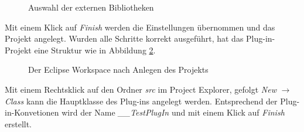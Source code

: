 \begin{figure}[H]
  \vspace{0.5cm}
  \centering
  \caption{Auswahl der externen Bibliotheken}
  \label{libs}
  \vspace{0.5cm}
\end{figure}

Mit einem Klick auf \textit{Finish} werden die Einstellungen übernommen und das Projekt angelegt. Wurden alle Schritte korrekt ausgeführt, hat das Plug-in-Projekt eine Struktur wie in Abbildung \ref{workspace}.

\begin{figure}[H]
  \vspace{0.5cm}
  \centering
  \caption{Der Eclipse Workspace nach Anlegen des Projekts}
  \label{workspace}
  \vspace{0.5cm}
\end{figure}

Mit einem Rechtsklick auf den Ordner \textit{src} im Project Explorer, gefolgt \textit{New} $\rightarrow$ \textit{Class} kann die Hauptklasse des Plug-ins angelegt werden. Entsprechend der Plug-in-Konvetionen wird der Name \textit{\_\_TestPlugIn} und mit einem Klick auf \textit{Finish} erstellt.

